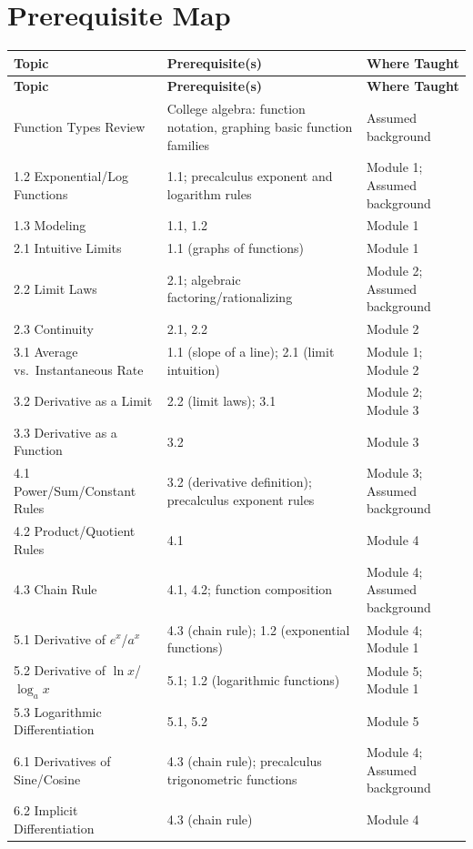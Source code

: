 \documentclass{article}
\begin{document}
\section{Prerequisite Map}
\begin{longtable}{p{4.3cm} p{6.2cm} p{4cm}}
\toprule
\textbf{Topic} & \textbf{Prerequisite(s)} & \textbf{Where Taught} \\
\midrule
\endfirsthead
\toprule
\textbf{Topic} & \textbf{Prerequisite(s)} & \textbf{Where Taught} \\
\midrule
\endhead
\bottomrule
\endfoot
1.1 Function Types Review & College algebra: function notation, graphing basic function families & Assumed background \\
1.2 Exponential/Log Functions & 1.1; precalculus exponent and logarithm rules & Module 1; Assumed background \\
1.3 Modeling & 1.1, 1.2 & Module 1 \\
2.1 Intuitive Limits & 1.1 (graphs of functions) & Module 1 \\
2.2 Limit Laws & 2.1; algebraic factoring/rationalizing & Module 2; Assumed background \\
2.3 Continuity & 2.1, 2.2 & Module 2 \\
3.1 Average vs.\ Instantaneous Rate & 1.1 (slope of a line); 2.1 (limit intuition) & Module 1; Module 2 \\
3.2 Derivative as a Limit & 2.2 (limit laws); 3.1 & Module 2; Module 3 \\
3.3 Derivative as a Function & 3.2 & Module 3 \\
4.1 Power/Sum/Constant Rules & 3.2 (derivative definition); precalculus exponent rules & Module 3; Assumed background \\
4.2 Product/Quotient Rules & 4.1 & Module 4 \\
4.3 Chain Rule & 4.1, 4.2; function composition & Module 4; Assumed background \\
5.1 Derivative of $e^x$/$a^x$ & 4.3 (chain rule); 1.2 (exponential functions) & Module 4; Module 1 \\
5.2 Derivative of $\ln x$/$\log_a x$ & 5.1; 1.2 (logarithmic functions) & Module 5; Module 1 \\
5.3 Logarithmic Differentiation & 5.1, 5.2 & Module 5 \\
6.1 Derivatives of Sine/Cosine & 4.3 (chain rule); precalculus trigonometric functions & Module 4; Assumed background \\
6.2 Implicit Differentiation & 4.3 (chain rule) & Module 4 \\

\end{longtable}
\end{document}
